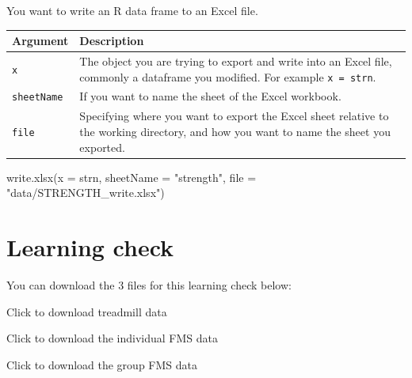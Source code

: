 \documentclass[
]{book}
\newenvironment{Shaded}{\begin{snugshade}}{\end{snugshade}}
\newcommand{\AttributeTok}[1]{\textcolor[rgb]{0.77,0.63,0.00}{#1}}
\newcommand{\FunctionTok}[1]{\textcolor[rgb]{0.00,0.00,0.00}{#1}}
\newcommand{\NormalTok}[1]{#1}
\newcommand{\StringTok}[1]{\textcolor[rgb]{0.31,0.60,0.02}{#1}}
\begin{document}
You want to write an R data frame to an Excel file.

\begin{longtable}[]{@{}
  >{\raggedright\arraybackslash}p{}
  >{\raggedright\arraybackslash}p{}@{}}
\toprule
Argument & Description \\
\midrule
\endhead
\texttt{x} & The object you are trying to export and write into an Excel file, commonly a dataframe you modified. For example \texttt{x\ =\ strn}. \\
\texttt{sheetName} & If you want to name the sheet of the Excel workbook. \\
\texttt{file} & Specifying where you want to export the Excel sheet relative to the working directory, and how you want to name the sheet you exported. \\
\bottomrule
\end{longtable}

\begin{Shaded}
\begin{Highlighting}[]
\FunctionTok{write.xlsx}\NormalTok{(}\AttributeTok{x =}\NormalTok{ strn,}
           \AttributeTok{sheetName =} \StringTok{"strength"}\NormalTok{,}
           \AttributeTok{file =} \StringTok{"data/STRENGTH\_write.xlsx"}\NormalTok{)}
\end{Highlighting}
\end{Shaded}

\hypertarget{INPUT-LEARNING-CHECK}{%
\section{Learning check}\label{INPUT-LEARNING-CHECK}}

You can download the 3 files for this learning check below:

Click to download treadmill data

Click to download the individual FMS data

Click to download the group FMS data
\end{document}
